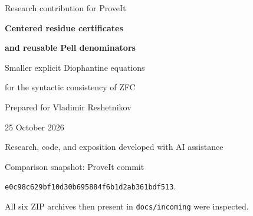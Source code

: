 \documentclass[11pt]{article}
\newcommand{\Con}{\operatorname{Con}}
\newcommand{\ZFC}{\mathrm{ZFC}}
\newcommand{\code}[1]{\nolinkurl{#1}}
\theoremstyle{remark}
\numberwithin{equation}{section}
\begin{document}
\hypersetup{pageanchor=false}
\begin{titlepage}
\vspace*{14mm}
{\Large Research contribution for ProveIt\par}
\vspace{9mm}
{\huge\bfseries Centered residue certificates\par}
\vspace{3mm}
{\huge\bfseries and reusable Pell denominators\par}
\vspace{8mm}
{\Large Smaller explicit Diophantine equations\par}
{\Large for the syntactic consistency of ZFC\par}
\vspace{12mm}
Prepared for Vladimir Reshetnikov\par
25 October 2026\par
Research, code, and exposition developed with AI assistance\par
\vspace{11mm}
\begin{abstract}
We give new explicit integer-coefficient polynomials whose absence of solutions, on their stated domains, is provably equivalent in ZFC to $\Con(\ZFC)$. The main structural reduction replaces eleven separate signed remainder intervals by quadratic radius certificates. A small canonical-residue bound, established before the factorial interpretation, makes these certificates sufficient to recover all the original Euclidean remainders. Two product coordinates merge the first two groups, and a parity construction replaces a three-square radix guard by one odd-square variable. The resulting direct proof-calculus quartic has \SignedVariables{} unrestricted integer variables, \SignedRows{} quadratic residuals, \SignedTerms{} collected monomials, and coefficient height \SignedHeight{}.

A separate admissible-denominator theorem improves the compact native construction. Its ten-positive-variable equations have operation/degree pairs $75/626$, $76/464$, and $77/460$. Every large coefficient is supplied literally and by a complete finite reconstruction. Natural-domain companion quartics and all coefficient expansions are included. The new proofs are ordinary mathematical proofs composed with the identified inherited numerical-calculus and native calibrations; the package does not assert a new end-to-end proof-assistant verification or a global simplicity minimum.
\end{abstract}
\vfill
\small
Comparison snapshot: ProveIt commit\par
\code{e0c98c629bf10d30b695884f6b1d2ab361bdf513}.\par
All six ZIP archives then present in \code{docs/incoming} were inspected.
\end{titlepage}
\hypersetup{pageanchor=true}
\begingroup
\small
\setlength{\parskip}{0pt}
\tableofcontents
\endgroup
\clearpage
{}
\end{document}
